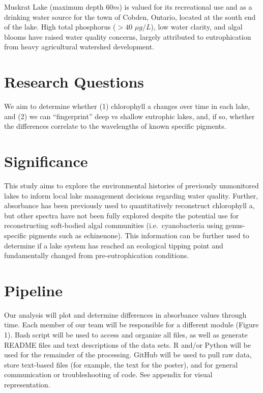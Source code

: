 \documentclass[]{article}
\begin{document}
Muskrat Lake (maximum depth \(60m\)) is valued for its recreational use
and as a drinking water source for the town of Cobden, Ontario, located
at the south end of the lake. High total phosphorus (\(>40\)
\(\mu g/L\)), low water clarity, and algal blooms have raised water
quality concerns, largely attributed to eutrophication from heavy
agricultural watershed development.

\section{Research Questions}\label{research-questions}

We aim to determine whether (1) chlorophyll a changes over time in each
lake, and (2) we can ``fingerprint'' deep vs shallow eutrophic lakes,
and, if so, whether the differences correlate to the wavelengths of
known specific pigments.

\section{Significance}\label{significance}

This study aims to explore the environmental histories of previously
unmonitored lakes to inform local lake management decisions regarding
water quality. Further, absorbance has been previously used to
quantitatively reconstruct chlorophyll a, but other spectra have not
been fully explored despite the potential use for reconstructing
soft-bodied algal communities (i.e.~cyanobacteria using genus-specific
pigments such as echinenone). This information can be further used to
determine if a lake system has reached an ecological tipping point and
fundamentally changed from pre-eutrophication conditions.

\section{Pipeline}\label{pipeline}

Our analysis will plot and determine differences in absorbance values
through time. Each member of our team will be responsible for a
different module (Figure 1). Bash script will be used to access and
organize all files, as well as generate README files and text
descriptions of the data sets. R and/or Python will be used for the
remainder of the processing. GitHub will be used to pull raw data, store
text-based files (for example, the text for the poster), and for general
communication or troubleshooting of code. See appendix for visual
representation.
\end{document}
